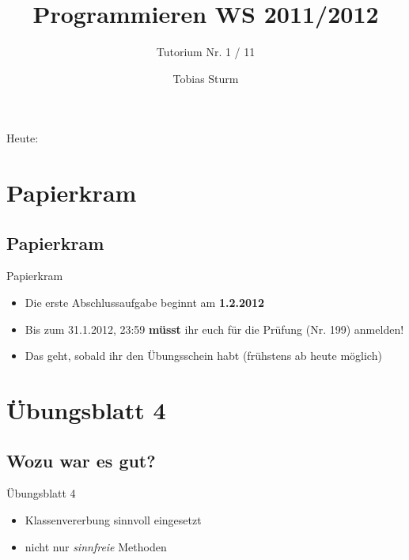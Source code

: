 \documentclass[18pt]{beamer}
\title[Proggen WS11/12]{Programmieren WS 2011/2012}
\subtitle{Tutorium Nr. 1 / 11}
\author{Tobias Sturm} %
\institute{Zertifizierbare Vertrauenswürdige Informatiksysteme}
\date[23.1.12] %
\begin{document}


\begin{frame}
	\titlepage
\end{frame}


\begin{frame}{Heute:}
	\tableofcontents
\end{frame}


\section*{Papierkram}
\subsection*{Papierkram}
\begin{frame}{Papierkram}
	\begin{itemize}
		\item Die erste Abschlussaufgabe beginnt am \textbf{1.2.2012}
		\item Bis zum 31.1.2012, 23:59 \textbf{müsst} ihr euch für die Prüfung (Nr. 199) anmelden!
		\item Das geht, sobald ihr den Übungsschein habt (frühstens ab heute möglich)	
	\end{itemize}
\end{frame}

\section{Übungsblatt 4}
\subsection*{Wozu war es gut?}
\begin{frame}{Übungsblatt 4}
	\begin{itemize}
		\item Klassenvererbung sinnvoll eingesetzt
		\item nicht nur \emph{sinnfreie} Methoden
	\end{itemize}
\end{frame}
\end{document}
